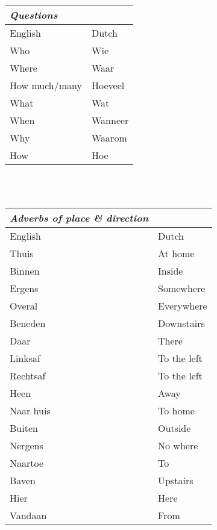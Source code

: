 \documentclass[letterpaper,11pt]{article}
\begin{document}
\begin{tabular}[t]{|l | l|}
    \hline
    \textit{Questions} &         \\
    \hline
    English            & Dutch   \\
    \hline
    Who                & Wie     \\
    Where              & Waar    \\
    How much/many      & Hoeveel \\
    What               & Wat     \\
    When               & Wanneer \\
    Why                & Waarom  \\
    How                & Hoe     \\
    \hline
\end{tabular}
\\ \\
\begin{tabular}[t]{|l | l|}
    \hline
    \textit{Adverbs of place \& direction} &         \\
    \hline
    English            & Dutch   \\
    \hline
    Thuis & At home \\
    Binnen & Inside \\
    Ergens & Somewhere \\
    Overal & Everywhere \\
    Beneden & Downstairs \\
    Daar & There \\
    Linksaf & To the left \\
    Rechtsaf & To the left \\
    Heen & Away \\
    Naar huis & To home \\
    Buiten & Outside \\
    Nergens & No where \\
    Naartoe & To \\
    Baven & Upstairs \\
    Hier & Here \\
    Vandaan & From \\
    \hline
\end{tabular}
\end{document}
